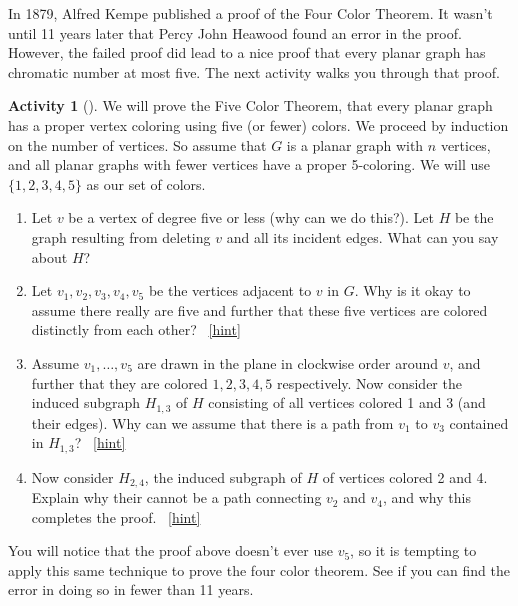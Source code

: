 \documentclass[10pt,]{book}
\theoremstyle{plain}
\theoremstyle{definition}
\theoremstyle{definition}
\theoremstyle{definition}
\newtheorem{activity}[project]{Activity}
\numberwithin{equation}{chapter}
\begin{document}
\hypertarget{p-354}{}%
In 1879, Alfred Kempe published a proof of the Four Color Theorem.  It wasn't until 11 years later that Percy John Heawood found an error in the proof.  However, the failed proof did lead to a nice proof that every planar graph has chromatic number at most five.  The next activity walks you through that proof.%
\begin{activity}[]\label{activity-32}
\hypertarget{p-355}{}%
We will prove the Five Color Theorem, that every planar graph has a proper vertex coloring using five (or fewer) colors.  We proceed by induction on the number of vertices.  So assume that \(G\) is a planar graph with \(n\) vertices, and all planar graphs with fewer vertices have a proper 5-coloring.  We will use \(\{1,2,3,4,5\}\) as our set of colors.%
\begin{enumerate}[font=\bfseries,label=(\alph*),ref=\alph*]
\item\label{task-50} \hypertarget{p-356}{}%
Let \(v\) be a vertex of degree five or less (why can we do this?).  Let \(H\) be the graph resulting from deleting \(v\) and all its incident edges.  What can you say about \(H\)?%
\item\label{task-51} \hypertarget{p-357}{}%
Let \(v_1, v_2, v_3, v_4, v_5\) be the vertices adjacent to \(v\) in \(G\).  Why is it okay to assume there really are five and further that these five vertices are colored distinctly from each other?%
~\hfill{\tiny\hyperlink{a-39.b}{[hint]}\hypertarget{q-39.b}{}}\item\label{task-52} \hypertarget{p-359}{}%
Assume \(v_1, \ldots, v_5\) are drawn in the plane in clockwise order around \(v\), and further that they are colored \(1,2,3,4,5\) respectively.  Now consider the induced subgraph \(H_{1,3}\) of \(H\) consisting of all vertices colored 1 and 3 (and their edges).  Why can we assume that there is a path from \(v_1\) to \(v_3\) contained in \(H_{1,3}\)?%
~\hfill{\tiny\hyperlink{a-39.c}{[hint]}\hypertarget{q-39.c}{}}\item\label{task-53} \hypertarget{p-361}{}%
Now consider \(H_{2,4}\), the induced subgraph of \(H\) of vertices colored 2 and 4.  Explain why their cannot be a path connecting \(v_2\) and \(v_4\), and why this completes the proof.%
~\hfill{\tiny\hyperlink{a-39.d}{[hint]}\hypertarget{q-39.d}{}}\end{enumerate}
\end{activity}
\hypertarget{p-363}{}%
You will notice that the proof above doesn't ever use \(v_5\), so it is tempting to apply this same technique to prove the four color theorem.  See if you can find the error in doing so in fewer than 11 years.%
\typeout{************************************************}
\typeout{************************************************}
\end{document}
